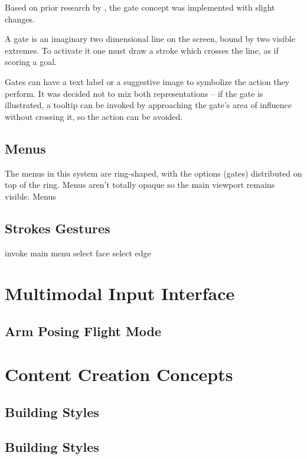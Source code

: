 Based on prior research by \cite{CROSSY}, the gate concept was implemented with slight changes.

A gate is an imaginary two dimensional line on the screen, bound by two visible extremes.
To activate it one must draw a stroke which crosses the line, as if scoring a goal.

Gates can have a text label or a suggestive image to symbolize the action they perform.
It was decided not to mix both representations -- if the gate is illustrated, a tooltip can be invoked
by approaching the gate's area of influence without crossing it, so the action can be avoided.



\subsection{Menus}

The menus in this system are ring-shaped, with the options (gates) distributed on top of the ring.
Menus aren't totally opaque so the main viewport remains visible.
Menus 




\subsection{Strokes Gestures}

invoke main menu
select face
select edge


\section{Multimodal Input Interface}

\subsection{Arm Posing Flight Mode}


\section{Content Creation Concepts}

\subsection{Building Styles}

\subsection{Building Styles}